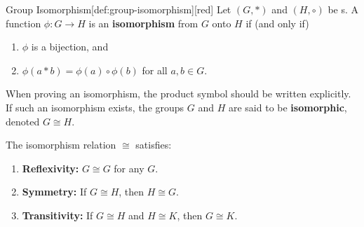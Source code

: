 \begin{define}{Group Isomorphism}[def:group-isomorphism][red]
  Let \((G, *)\) and \((H, \circ)\) be s.
  A function \(\phi: G \to H\) is an \textbf{isomorphism} from \(G\) onto \(H\) if (and only if)
  \begin{enumerate}
    \item \(\phi\) is a bijection, and
    \item \(\phi(a * b) = \phi(a) \circ \phi(b)\) for all \(a, b \in G\).
  \end{enumerate}
  When proving an isomorphism, the product symbol should be written explicitly.
  If such an isomorphism exists, 
  the groups \(G\) and \(H\) are said to be \textbf{isomorphic}, denoted \(G \cong H\).
  
  The isomorphism relation \(\cong\) satisfies:
  \begin{enumerate}
    \item \textbf{Reflexivity:} \(G \cong G\) for any  \(G\).
    \item \textbf{Symmetry:} If \(G \cong H\), then \(H \cong G\).
    \item \textbf{Transitivity:} If \(G \cong H\) and \(H \cong K\), then \(G \cong K\).
  \end{enumerate}
\end{define}

